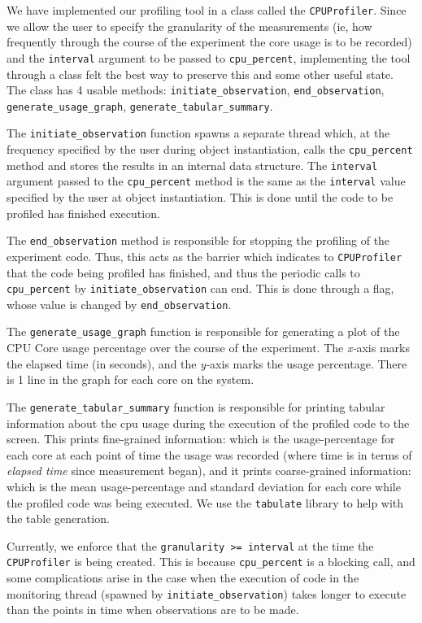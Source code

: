\documentclass[a4paper,12pt]{article}
\begin{document}
We have implemented our profiling tool in a class called the \verb|CPUProfiler|. Since we allow the user to specify the granularity of the measurements (ie, how frequently through the course of the experiment the core usage is to be recorded) and the \verb|interval| argument to be passed to \verb|cpu_percent|, implementing the tool through a class felt the best way to preserve this and some other useful state. The class has 4 usable methods: \verb|initiate_observation|, \verb|end_observation|, \verb|generate_usage_graph|, \verb|generate_tabular_summary|.

The \verb|initiate_observation| function spawns a separate thread which, at the frequency specified by the user during object instantiation, calls the \verb|cpu_percent| method and stores the results in an internal data structure. The \verb|interval| argument passed to the \verb|cpu_percent| method is the same as the \verb|interval| value specified by the user at object instantiation. This is done until the code to be profiled has finished execution. 

The \verb|end_observation| method is responsible for stopping the profiling of the experiment code. Thus, this acts as the barrier which indicates to \verb|CPUProfiler| that the code being profiled has finished, and thus the periodic calls to \verb|cpu_percent| by \verb|initiate_observation| can end. This is done through a flag, whose value is changed by \verb|end_observation|.

The \verb|generate_usage_graph| function is responsible for generating a plot of the CPU Core usage percentage over the course of the experiment. The \textit{x-}axis marks the elapsed time (in seconds), and the \textit{y-}axis marks the usage percentage. There is 1 line in the graph for each core on the system.

The \verb|generate_tabular_summary| function is responsible for printing tabular information about the cpu usage during the execution of the profiled code to the screen. This prints fine-grained information: which is the usage-percentage for each core at each point of time the usage was recorded (where time is in terms of \textit{elapsed time} since measurement began), and it prints coarse-grained information: which is the mean usage-percentage and standard deviation for each core while the profiled code was being executed. We use the \verb|tabulate| library to help with the table generation. 

Currently, we enforce that the \verb|granularity >= interval| at the time the \verb|CPUProfiler| is being created. This is because \verb|cpu_percent| is a blocking call, and some complications arise in the case when the execution of code in the monitoring thread (spawned by \verb|initiate_observation|) takes longer to execute than the points in time when observations are to be made. 
\end{document}
